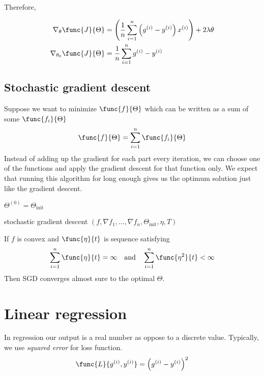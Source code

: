Therefore, 

\begin{align*}
    \nabla_{\theta} \func{J}{\Theta} &= \left(\dfrac{1}{n} \sum_{i = 1}^n \left(g^{(i)} - y^{(i)}\right) x^{(i)} \right) + 2\lambda \theta\\
    \nabla_{\theta_0} \func{J}{\Theta} &= \dfrac{1}{n} \sum_{i = 1}^n g^{(i)} - y^{(i)} 
\end{align*}

\subsection{Stochastic gradient descent}
Suppose we want to minimize \(\func{f}{\Theta}\) which can be written as a sum of some \(\func{f_i}{\Theta}\)
\begin{equation*}
    \func{f}{\Theta} = \sum_{i = 1}^n \func{f_i}{\Theta}
\end{equation*}
Instead of adding up the gradient for each part every iteration, we can choose one of the functions and apply the gradient descent for that function only. We expect that running this algorithm for long enough gives us the optimum solution just like the gradient descent.

\begin{algorithm}[H]
    \DontPrintSemicolon
    $\Theta^{(0)} = \Theta_{\mathrm{init}} $\;

    \Return{$\theta $}
    \caption{stochastic gradient descent $(f, \nabla f_1 , \dots,  \nabla f_n, \Theta_{\mathrm{init}} , \eta , T )$}
\end{algorithm}

\begin{theorem}
    If \(f\) is convex and \(\func{\eta}{t}\) is sequence satisfying 
    \begin{equation*}
        \sum_{i= 1}^n \func{\eta}{t} = \infty \quad \mathrm{and} \quad \sum_{i= 1}^n \func{\eta^2}{t} < \infty
    \end{equation*}
    Then SGD converges almost sure to the optimal \(\Theta\).
\end{theorem}

\section{Linear regression}
In regression our output is a real number as oppose to a discrete value. Typically, we use \textit{squared error} for loss function.
\begin{equation*}
    \func{L}{g^{(i)}, y^{(i)}} = \left(g^{(i)} - y^{(i)}\right)^2
\end{equation*}

